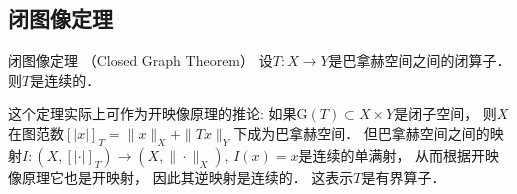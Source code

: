 \subsection{闭图像定理}
\begin{theorem}{闭图像定理 （Closed Graph Theorem）}
设$T:X\to Y$是巴拿赫空间之间的闭算子． 则$T$是连续的．
\end{theorem}
这个定理实际上可作为开映像原理的推论: 如果$\text{G}(T)\subset X\times Y$是闭子空间， 则$X$在图范数$[|x|]_T=\|x\|_X+\|Tx\|_Y$下成为巴拿赫空间． 但巴拿赫空间之间的映射$I:(X,[|\cdot|]_T)\to(X,\|\cdot\|_X),\,I(x)=x$是连续的单满射， 从而根据开映像原理它也是开映射， 因此其逆映射是连续的． 这表示$T$是有界算子．
